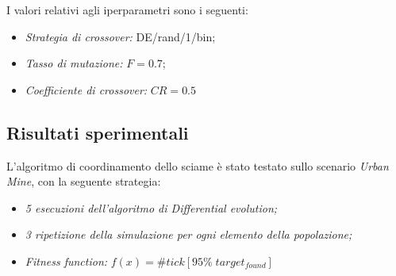 I valori relativi agli iperparametri sono i seguenti:
\begin{itemize}
    \item \textit{Strategia di crossover:} DE/rand/1/bin;
    \item \textit{Tasso di mutazione:} $F=0.7$;
    \item \textit{Coefficiente di crossover:} $CR=0.5$
\end{itemize}

\subsection{Risultati sperimentali}

L'algoritmo di coordinamento dello sciame è stato testato sullo scenario \textit{Urban Mine}, con la seguente strategia:
\begin{itemize}
    \item \textit{5 esecuzioni dell'algoritmo di Differential evolution;}
    \item \textit{3 ripetizione della simulazione per ogni elemento della popolazione;}
    \item \textit{Fitness function:} $f(x) = \# tick[95 \% \; target_{found}]$
\end{itemize}

